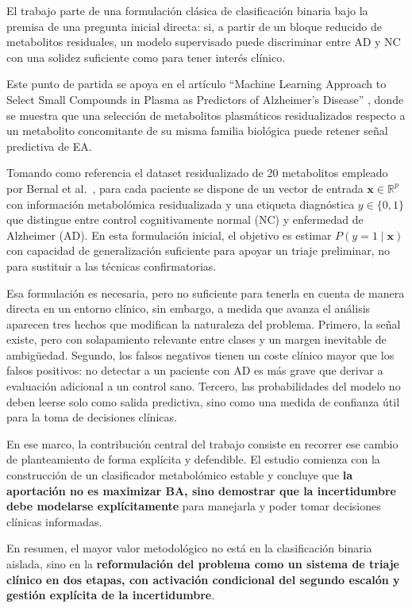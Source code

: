 El trabajo parte de una formulación clásica de clasificación binaria bajo la premisa de una pregunta inicial directa: si, a partir de un bloque reducido de metabolitos residuales, un modelo supervisado puede discriminar entre AD y NC con una solidez suficiente como para tener interés clínico.

Este punto de partida se apoya en el artículo ``Machine Learning Approach to Select Small Compounds in Plasma as Predictors of Alzheimer’s Disease'' \parencite{bernal2025metabolomics}, donde se muestra que una selección de metabolitos plasmáticos residualizados respecto a un metabolito concomitante de su misma familia biológica puede retener señal predictiva de EA.

Tomando como referencia el dataset residualizado de 20 metabolitos empleado por Bernal et al.~\parencite{bernal2025metabolomics}, para cada paciente se dispone de un vector de entrada $\mathbf{x} \in \mathbb{R}^p$ con información metabolómica residualizada y una etiqueta diagnóstica $y \in \{0,1\}$ que distingue entre control cognitivamente normal (NC) y enfermedad de Alzheimer (AD). En esta formulación inicial, el objetivo es estimar $P(y=1\mid\mathbf{x})$ con capacidad de generalización suficiente para apoyar un triaje preliminar, no para sustituir a las técnicas confirmatorias.

Esa formulación es necesaria, pero no suficiente para tenerla en cuenta de manera directa en un entorno clínico, sin embargo, a medida que avanza el análisis aparecen tres hechos que modifican la naturaleza del problema. Primero, la señal existe, pero con solapamiento relevante entre clases y un margen inevitable de ambigüedad. Segundo, los falsos negativos tienen un coste clínico mayor que los falsos positivos: no detectar a un paciente con AD es más grave que derivar a evaluación adicional a un control sano. Tercero, las probabilidades del modelo no deben leerse solo como salida predictiva, sino como una medida de confianza útil para la toma de decisiones clínicas.

En ese marco, la contribución central del trabajo consiste en recorrer ese cambio de planteamiento de forma explícita y defendible. El estudio comienza con la construcción de un clasificador metabolómico estable y concluye que \textbf{la aportación no es maximizar BA, sino demostrar que la incertidumbre debe modelarse explícitamente} para manejarla y poder tomar decisiones clínicas informadas.

En resumen, el mayor valor metodológico no está en la clasificación binaria aislada, sino en la \textbf{reformulación del problema como un sistema de triaje clínico en dos etapas, con activación condicional del segundo escalón y gestión explícita de la incertidumbre}.

